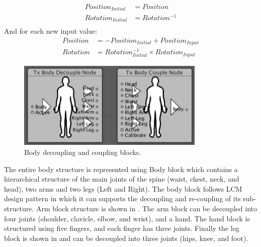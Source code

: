 \begin{equation}
\begin{split}
Position_{Initial}&=Position\\
Rotation_{Initial}&=Rotation^{-1}\\
\end{split}
\end{equation}
And for each new input value:
\begin{equation}
\begin{split}
Position&=-Position_{Initial}+Position_{Input}\\
Rotation&=Rotation_{Initial}^{-1}\times Rotation_{Input}
\end{split}
\end{equation}

\begin{figure}[b!]
\centering
\captionsetup{justification=centering} 
\includegraphics[width=0.8\textwidth]{figures/system/Blocks/Body.png}
\caption{Body decoupling and coupling blocks.}
  \label{fig:system-blocks-body}
\end{figure}

The entire body structure is represented using Body block  which contains a hierarchical structure of the main joints of the spine (waist, chest, neck, and head), two arms and two legs (Left and Right). The body block follows LCM design pattern in which it can supports the decoupling and re-coupling of its sub-structure. Arm block structure is shown in . The arm block can be decoupled into four joints (shoulder, clavicle, elbow, and wrist), and a hand. The hand block is structured using five fingers, and each finger has three joints. Finally the leg block is shown in  and can be decoupled into three joints (hips, knee, and foot). 



